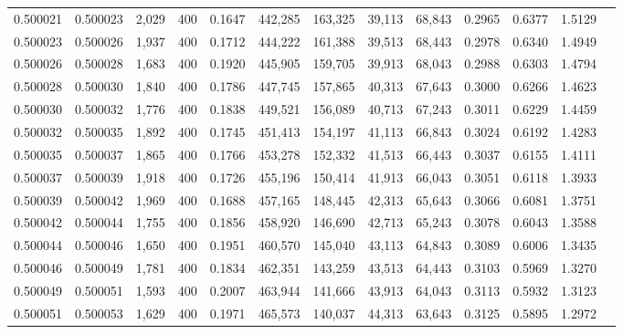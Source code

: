 \begin{tabular}{rrrrrrrrrrrrr}
0.500021 & 0.500023 &  2,029 & 400 &                                     0.1647 & 442,285 & 163,325 &  39,113 &  68,843 & 0.2965 & 0.6377 & 1.5129 \\
0.500023 & 0.500026 &  1,937 & 400 &                                     0.1712 & 444,222 & 161,388 &  39,513 &  68,443 & 0.2978 & 0.6340 & 1.4949 \\
0.500026 & 0.500028 &  1,683 & 400 &                                     0.1920 & 445,905 & 159,705 &  39,913 &  68,043 & 0.2988 & 0.6303 & 1.4794 \\
0.500028 & 0.500030 &  1,840 & 400 &                                     0.1786 & 447,745 & 157,865 &  40,313 &  67,643 & 0.3000 & 0.6266 & 1.4623 \\
0.500030 & 0.500032 &  1,776 & 400 &                                     0.1838 & 449,521 & 156,089 &  40,713 &  67,243 & 0.3011 & 0.6229 & 1.4459 \\
0.500032 & 0.500035 &  1,892 & 400 &                                     0.1745 & 451,413 & 154,197 &  41,113 &  66,843 & 0.3024 & 0.6192 & 1.4283 \\
0.500035 & 0.500037 &  1,865 & 400 &                                     0.1766 & 453,278 & 152,332 &  41,513 &  66,443 & 0.3037 & 0.6155 & 1.4111 \\
0.500037 & 0.500039 &  1,918 & 400 &                                     0.1726 & 455,196 & 150,414 &  41,913 &  66,043 & 0.3051 & 0.6118 & 1.3933 \\
0.500039 & 0.500042 &  1,969 & 400 &                                     0.1688 & 457,165 & 148,445 &  42,313 &  65,643 & 0.3066 & 0.6081 & 1.3751 \\
0.500042 & 0.500044 &  1,755 & 400 &                                     0.1856 & 458,920 & 146,690 &  42,713 &  65,243 & 0.3078 & 0.6043 & 1.3588 \\
0.500044 & 0.500046 &  1,650 & 400 &                                     0.1951 & 460,570 & 145,040 &  43,113 &  64,843 & 0.3089 & 0.6006 & 1.3435 \\
0.500046 & 0.500049 &  1,781 & 400 &                                     0.1834 & 462,351 & 143,259 &  43,513 &  64,443 & 0.3103 & 0.5969 & 1.3270 \\
0.500049 & 0.500051 &  1,593 & 400 &                                     0.2007 & 463,944 & 141,666 &  43,913 &  64,043 & 0.3113 & 0.5932 & 1.3123 \\
0.500051 & 0.500053 &  1,629 & 400 &                                     0.1971 & 465,573 & 140,037 &  44,313 &  63,643 & 0.3125 & 0.5895 & 1.2972 \\

\end{tabular}
